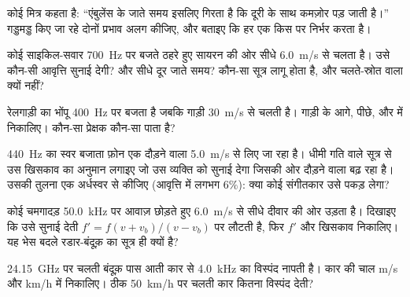 \begin{exercise}[$\star$]\label{exo:g12:doppler-effect:2}
कोई मित्र कहता है: ``एंबुलेंस के जाते समय  इसलिए गिरता है कि
दूरी के साथ  कमज़ोर पड़ जाती है।'' गड्डमड्ड किए जा रहे दोनों
प्रभाव अलग कीजिए, और बताइए कि हर एक किस पर निर्भर करता है।
\end{exercise}

\begin{exercise}[$\star$]\label{exo:g12:doppler-effect:3}
कोई साइकिल-सवार \qty{700}{Hz} पर बजते ठहरे हुए सायरन की ओर सीधे \qty{6.0}{m/s} से चलता है।
उसे कौन-सी आवृत्ति सुनाई देगी? और सीधे दूर जाते समय? कौन-सा सूत्र
लागू होता है, और चलते-स्रोत वाला क्यों नहीं?
\end{exercise}

\begin{exercise}[$\star$]\label{exo:g12:doppler-effect:4}
रेलगाड़ी का भोंपू \qty{400}{Hz} पर बजता है जबकि गाड़ी \qty{30}{m/s} से चलती है। गाड़ी के
आगे, पीछे, और  में  निकालिए। कौन-सा प्रेक्षक कौन-सा
पाता है?
\end{exercise}

\begin{exercise}[$\star$]\label{exo:g12:doppler-effect:5}
\qty{440}{Hz} का स्वर बजाता फ़ोन एक दौड़ने वाला \qty{5.0}{m/s} से लिए जा रहा है। धीमी गति
वाले सूत्र से उस खिसकाव का अनुमान लगाइए जो उस व्यक्ति को सुनाई देगा जिसकी ओर
दौड़ने वाला बढ़ रहा है। उसकी तुलना एक अर्धस्वर से कीजिए (आवृत्ति में
लगभग $6\%$): क्या कोई संगीतकार उसे पकड़ लेगा?
\end{exercise}

\begin{exercise}[$\star\star$]\label{exo:g12:doppler-effect:6}
कोई चमगादड़ \qty{50.0}{kHz} पर आवाज़ छोड़ते हुए \qty{6.0}{m/s} से सीधे दीवार की ओर उड़ता है।
दिखाइए कि उसे सुनाई देती  $f' = f(v + v_b)/(v - v_b)$ पर लौटती है, फिर $f'$
और खिसकाव निकालिए। यह भेस बदले रडार-बंदूक़ का सूत्र ही क्यों है?
\end{exercise}

\begin{exercise}[$\star\star$]\label{exo:g12:doppler-effect:7}
\qty{24.15}{GHz} पर चलती  बंदूक़ पास आती कार से \qty{4.0}{kHz} का विस्पंद नापती
है। कार की चाल \unit{m/s} और \unit{km/h} में निकालिए। ठीक \qty{50}{km/h} पर चलती कार कितना
विस्पंद देती?
\end{exercise}

